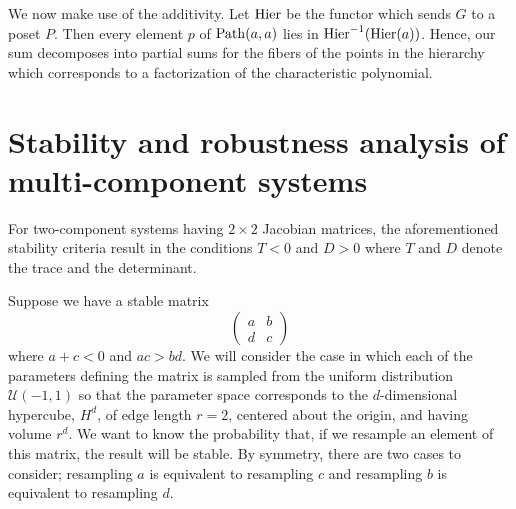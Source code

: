 We now make use of the additivity.  Let $\mathrm{Hier}$ be the functor which
sends $G$ to a poset $P$.  Then every element $p$ of $\mathrm{Path}(a,a)$ lies
in $\mathrm{Hier}^{-1} (\mathrm{Hier}(a))$.  Hence, our sum decomposes into partial sums
for the fibers of the points in the hierarchy which corresponds to a
factorization of the characteristic polynomial.

\section{Stability and robustness analysis of multi-component systems}
For two-component systems having $2 \times 2$ Jacobian matrices, the aforementioned stability criteria result in the conditions $T < 0$ and $D >
0$ where $T$ and $D$ denote the trace and the determinant.

Suppose we have a stable matrix
$$
\begin{pmatrix}
a & b \\
d & c
\end{pmatrix}
$$
where $a + c < 0$ and $ac > bd$. We will consider the case in which each of the parameters defining the matrix is sampled from the uniform distribution $\mathcal{U}(-1,1)$ so that the parameter space corresponds to the $d$-dimensional hypercube, $H^d$, of edge length $r=2$, centered about the origin, and having volume $r^d$.  We want to know the probability that, if we resample an element of this matrix, the result will be stable.  By symmetry, there are two cases to consider; resampling $a$ is equivalent to resampling $c$ and resampling $b$ is equivalent
to resampling $d$.

